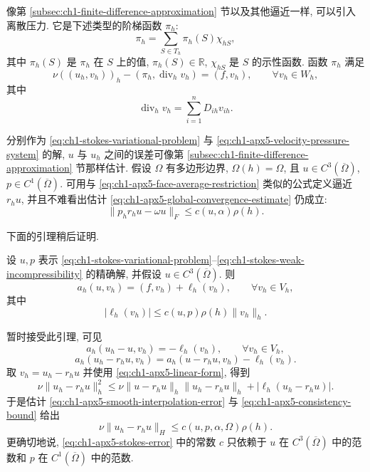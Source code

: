 像第 \ref{subsec:ch1-finite-difference-approximation} 节以及其他逼近一样, 可以引入离散压力. 它是下述类型的阶梯函数 $\pi_h$:
\begin{equation}
\pi_h=\sum_{S\in T_h}\pi_h(S)\chi_{hS},
\label{eq:ch1-apx5-discrete-pressure}
\end{equation}
其中 $\pi_h(S)$ 是 $\pi_h$ 在 $S$ 上的值, $\pi_h(S)\in\mathbb R$, $\chi_{hS}$ 是 $S$ 的示性函数. 函数 $\pi_h$ 满足
\begin{equation}
\nu((u_h,v_h))_h-(\pi_h,\operatorname{div}_hv_h)
=(f,v_h),
\qquad\forall v_h\in W_h,
\label{eq:ch1-apx5-velocity-pressure-system}
\end{equation}
其中
\begin{equation}
\operatorname{div}_hv_h=\sum_{i=1}^nD_{ih}v_{ih}.
\label{eq:ch1-apx5-discrete-divergence}
\end{equation}

分别作为 \eqref{eq:ch1-stokes-variational-problem} 与 \eqref{eq:ch1-apx5-velocity-pressure-system} 的解, $u$ 与 $u_h$ 之间的误差可像第 \ref{subsec:ch1-finite-difference-approximation} 节那样估计. 假设 $\Omega$ 有多边形边界, $\Omega(h)=\Omega$, 且 $u\in C^3(\overline\Omega)$, $p\in C^1(\overline\Omega)$. 可用与 \eqref{eq:ch1-apx5-face-average-restriction} 类似的公式定义逼近 $r_hu$, 并且不难看出估计 \eqref{eq:ch1-apx5-global-convergence-estimate} 仍成立:
\begin{equation}
\|p_hr_hu-\omega u\|_F\leq c(u,\alpha)\rho(h).
\label{eq:ch1-apx5-smooth-interpolation-error}
\end{equation}

下面的引理稍后证明.

\begin{Lemma}
\label{lem:ch1-apx5-consistency}
设 $u,p$ 表示 \eqref{eq:ch1-stokes-variational-problem}–\eqref{eq:ch1-stokes-weak-incompressibility} 的精确解, 并假设 $u\in C^3(\overline\Omega)$. 则
\begin{equation}
a_h(u,v_h)=(f,v_h)+\ell_h(v_h),
\qquad\forall v_h\in V_h,
\label{eq:ch1-apx5-consistency-identity}
\end{equation}
其中
\begin{equation}
|\ell_h(v_h)|\leq c(u,p)\rho(h)\|v_h\|_h.
\label{eq:ch1-apx5-consistency-bound}
\end{equation}
\end{Lemma}

暂时接受此引理, 可见
\[
a_h(u_h-u,v_h)=-\ell_h(v_h),
\qquad\forall v_h\in V_h,
\]
\[
a_h(u_h-r_hu,v_h)=a_h(u-r_hu,v_h)-\ell_h(v_h).
\]
取 $v_h=u_h-r_hu$ 并使用 \eqref{eq:ch1-apx5-linear-form}, 得到
\[
\nu\|u_h-r_hu\|_h^2
\leq\nu\|u-r_hu\|_h\|u_h-r_hu\|_h
+|\ell_h(u_h-r_hu)|.
\]
于是估计 \eqref{eq:ch1-apx5-smooth-interpolation-error} 与 \eqref{eq:ch1-apx5-consistency-bound} 给出
\begin{equation}
\nu\|u_h-r_hu\|_H\leq c(u,p,\alpha,\Omega)\rho(h).
\label{eq:ch1-apx5-stokes-error}
\end{equation}
更确切地说, \eqref{eq:ch1-apx5-stokes-error} 中的常数 $c$ 只依赖于 $u$ 在 $C^3(\overline\Omega)$ 中的范数和 $p$ 在 $C^1(\overline\Omega)$ 中的范数.

